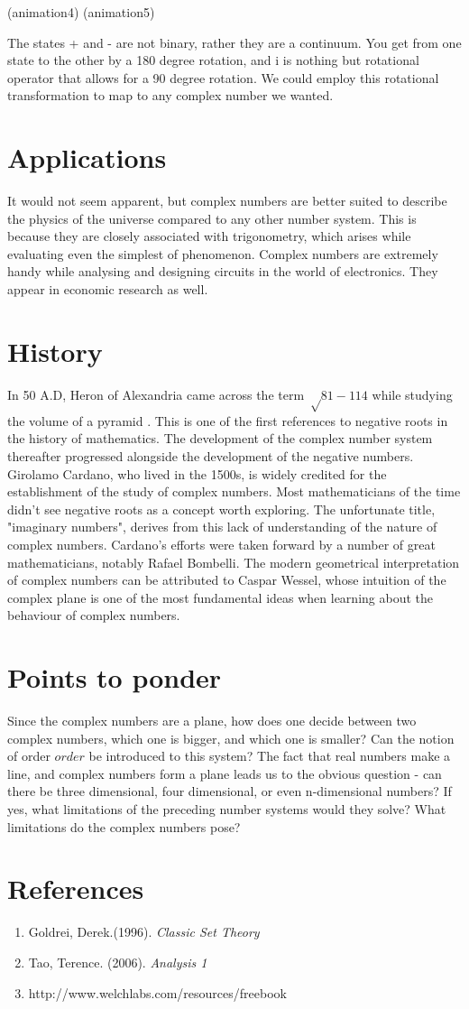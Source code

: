 \documentclass[final,3p]{CSP}
\begin{document}
(animation4)
(animation5)

The states + and - are not binary, rather they are a continuum. You get from one state to the other by a 180 degree rotation, and i is nothing but rotational operator that allows for a 90 degree rotation. We could employ this rotational transformation to map to any complex number we wanted. 

\section{Applications}
It would not seem apparent, but complex numbers are better suited to describe the physics of the universe compared to any other number system. This is because they are closely associated with trigonometry, which arises while evaluating even the simplest of phenomenon. Complex numbers are extremely handy while analysing and designing circuits in the world of electronics. They appear in economic research as well. 

\section{History}
 In 50 A.D, Heron of Alexandria came across the term $√81-114$ while studying the volume of a pyramid . This is one of the first references to negative roots in the history of mathematics. The development of the complex number system thereafter progressed alongside the development of the negative numbers. Girolamo Cardano, who lived in the 1500s, is widely credited for the establishment of the study of complex numbers. Most mathematicians of the time didn't see negative roots as a concept worth exploring. The unfortunate title, "imaginary numbers", derives from this lack of understanding of the nature of complex numbers. Cardano's efforts were taken forward by a number of great mathematicians, notably Rafael Bombelli. The modern geometrical interpretation of complex numbers can be attributed to Caspar Wessel, whose intuition of the complex plane is one of the most fundamental ideas when learning about the behaviour of complex numbers. 
 
\section{Points to ponder}
Since the complex numbers are a plane, how does one decide between two complex numbers, which one is bigger, and which one is smaller? Can the notion of order $\textit{order}$ be introduced to this system?
The fact that real numbers make a line, and complex numbers form a plane leads us to the obvious question - can there be three dimensional, four dimensional, or even n-dimensional numbers? If yes, what limitations of the preceding number systems would they solve? What limitations do the complex numbers pose?

\section{References}
\begin{enumerate}
    \item Goldrei, Derek.(1996). \textit{Classic Set Theory}
    \item Tao, Terence. (2006). \textit{Analysis 1}
    \item http://www.welchlabs.com/resources/freebook
\end{enumerate}
\end{document}
